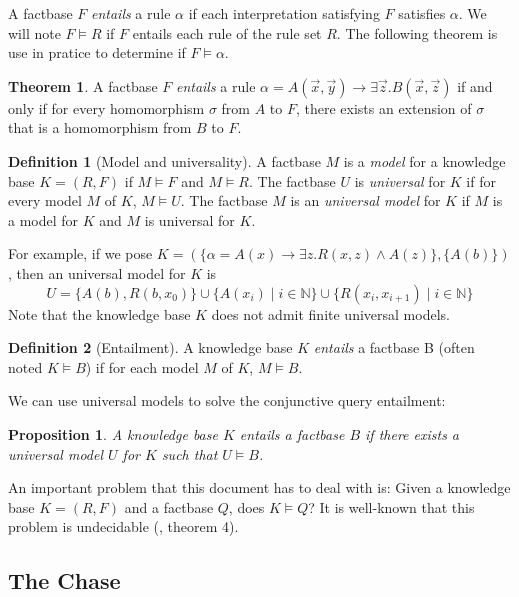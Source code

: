 \documentclass{article}
\newtheorem{proposition}{Proposition}[section]
\theoremstyle{definition}
\newtheorem{definition}{Definition}[section]
\newtheorem{theorem}{Theorem}[section]
\theoremstyle{remark}
\def \N {\mathbb N}
\begin{document}
A factbase $F$ \emph{entails} a rule $\alpha$ if each interpretation satisfying $F$ satisfies $\alpha$. We will note $F \models R$ if $F$ entails each rule of the rule set $R$. The following theorem is use in pratice to determine if $F \models \alpha$.

\begin{theorem}
A factbase $F$ \emph{entails} a rule $\alpha = A(\vec x,\vec y) \rightarrow \exists \vec z. B(\vec x,\vec z)$ if and only if for every homomorphism $\sigma$ from $A$ to $F$, there exists an extension of $\sigma$ that is a homomorphism from $B$ to $F$.
\end{theorem}

\begin{definition}[Model and universality]
A factbase $M$ is a \emph{model} for a knowledge base $K = (R,F)$ if $M \models F$ and $M \models R$. The factbase $U$ is \emph{universal} for $K$ if for every model $M$ of $K$, $M \models U$. The factbase $M$ is an \emph{universal model} for $K$ if $M$ is a model for $K$ and $M$ is universal for $K$.
\end{definition}

For example, if we pose $K = (\{\alpha = A(x) \rightarrow \exists z.R(x,z) \wedge A(z)\},\{A(b)\})$, then an universal model for $K$ is $$U = \{A(b),R(b,x_0)\}\cup \{A(x_i)\mid i \in \N\}\cup \{R(x_i,x_{i+1}) \mid i \in \N\}$$ Note that the knowledge base $K$ does not admit finite universal models.


\begin{definition}[Entailment]
A knowledge base $K$ \emph{entails} a factbase B (often noted $K \models B$) if for each model $M$ of $K$, $M \models B$.
\end{definition}

We can use universal models to solve the conjunctive query entailment:

\begin{proposition}
A knowledge base $K$ entails a factbase $B$ if there exists a universal model $U$ for $K$ such that $U \models B$.
\end{proposition}

An important problem that this document has to deal with is: Given a knowledge base $K=(R,F)$ and a factbase $Q$,  does $K \models Q$? It  is  well-known  that  this  problem  is  undecidable (\cite{NP2}, theorem 4). 



\subsection{The Chase}
\end{document}
